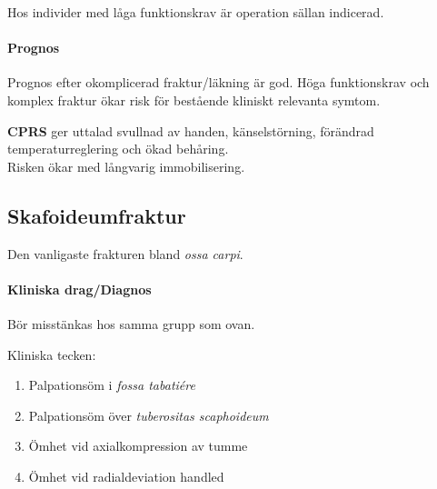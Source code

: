 \documentclass[
  letterpaper,
  DIV=11,
  numbers=noendperiod]{scrreport}
\let\oldparagraph\paragraph
\renewcommand{\paragraph}[1]{\oldparagraph{#1}\mbox{}}
\providecommand{\tightlist}{%
  \setlength{\itemsep}{0pt}\setlength{\parskip}{0pt}}\usepackage{longtable,booktabs,array}
\begin{document}
Hos individer med låga funktionskrav är operation sällan indicerad.

\hypertarget{prognos-5}{%
\paragraph{Prognos}\label{prognos-5}}

Prognos efter okomplicerad fraktur/läkning är god. Höga funktionskrav
och komplex fraktur ökar risk för bestående kliniskt relevanta symtom.

\begin{tcolorbox}[enhanced jigsaw, colback=white, colbacktitle=quarto-callout-warning-color!10!white, toptitle=1mm, arc=.35mm, toprule=.15mm, rightrule=.15mm, titlerule=0mm, breakable, bottomrule=.15mm, colframe=quarto-callout-warning-color-frame, left=2mm, opacityback=0, coltitle=black, title=\textcolor{quarto-callout-warning-color}{\faExclamationTriangle}\hspace{0.5em}{Complex Regional Pain Syndrome}, leftrule=.75mm, bottomtitle=1mm, opacitybacktitle=0.6]

\textbf{CPRS} ger uttalad svullnad av handen, känselstörning, förändrad
temperaturreglering och ökad behåring.\\
Risken ökar med långvarig immobilisering.

\end{tcolorbox}

\hypertarget{skafoideumfraktur}{%
\subsection{Skafoideumfraktur}\label{skafoideumfraktur}}

Den vanligaste frakturen bland \emph{ossa carpi}.

\hypertarget{kliniska-dragdiagnos-6}{%
\paragraph{Kliniska drag/Diagnos}\label{kliniska-dragdiagnos-6}}

Bör misstänkas hos samma grupp som ovan.

Kliniska tecken:

\begin{enumerate}
\def\labelenumi{\arabic{enumi}.}
\tightlist
\item
  Palpationsöm i \emph{fossa tabatiére}
\item
  Palpationsöm över \emph{tuberositas scaphoideum}
\item
  Ömhet vid axialkompression av tumme
\item
  Ömhet vid radialdeviation handled
\end{enumerate}
\end{document}
